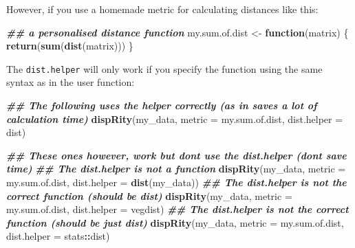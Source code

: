 \documentclass[
]{book}
\newenvironment{Shaded}{\begin{snugshade}}{\end{snugshade}}
\newcommand{\AttributeTok}[1]{\textcolor[rgb]{0.13,0.29,0.53}{#1}}
\newcommand{\ControlFlowTok}[1]{\textcolor[rgb]{0.13,0.29,0.53}{\textbf{#1}}}
\newcommand{\DecValTok}[1]{\textcolor[rgb]{0.00,0.00,0.81}{#1}}
\newcommand{\DocumentationTok}[1]{\textcolor[rgb]{0.56,0.35,0.01}{\textbf{\textit{#1}}}}
\newcommand{\FunctionTok}[1]{\textcolor[rgb]{0.13,0.29,0.53}{\textbf{#1}}}
\newcommand{\NormalTok}[1]{#1}
\newcommand{\OtherTok}[1]{\textcolor[rgb]{0.56,0.35,0.01}{#1}}
\newcommand{\SpecialCharTok}[1]{\textcolor[rgb]{0.81,0.36,0.00}{\textbf{#1}}}
\begin{document}
However, if you use a homemade metric for calculating distances like this:

\begin{Shaded}
\begin{Highlighting}[]
\DocumentationTok{\#\# a personalised distance function}
\NormalTok{my.sum.of.dist }\OtherTok{\textless{}{-}} \ControlFlowTok{function}\NormalTok{(matrix) \{}
  \FunctionTok{return}\NormalTok{(}\FunctionTok{sum}\NormalTok{(}\FunctionTok{dist}\NormalTok{(matrix)))}
\NormalTok{\}}
\end{Highlighting}
\end{Shaded}

The \texttt{dist.helper} will only work if you specify the function using the same syntax as in the user function:

\begin{Shaded}
\begin{Highlighting}[]
\DocumentationTok{\#\# The following uses the helper correctly (as in saves a lot of calculation time)}
\FunctionTok{dispRity}\NormalTok{(my\_data, }\AttributeTok{metric =}\NormalTok{ my.sum.of.dist, }\AttributeTok{dist.helper =}\NormalTok{ dist)}

\DocumentationTok{\#\# These ones however, work but don\textquotesingle{}t use the dist.helper (don\textquotesingle{}t save time)}
\DocumentationTok{\#\# The dist.helper is not a function}
\FunctionTok{dispRity}\NormalTok{(my\_data, }\AttributeTok{metric =}\NormalTok{ my.sum.of.dist, }\AttributeTok{dist.helper =} \FunctionTok{dist}\NormalTok{(my\_data))}
\DocumentationTok{\#\# The dist.helper is not the correct function (should be dist)}
\FunctionTok{dispRity}\NormalTok{(my\_data, }\AttributeTok{metric =}\NormalTok{ my.sum.of.dist, }\AttributeTok{dist.helper =}\NormalTok{ vegdist)}
\DocumentationTok{\#\# The dist.helper is not the correct function (should be just dist)}
\FunctionTok{dispRity}\NormalTok{(my\_data, }\AttributeTok{metric =}\NormalTok{ my.sum.of.dist, }\AttributeTok{dist.helper =}\NormalTok{ stats}\SpecialCharTok{::}\NormalTok{dist)}
\end{Highlighting}
\end{Shaded}

\begin{Shaded}
\end{Shaded}
\end{document}
